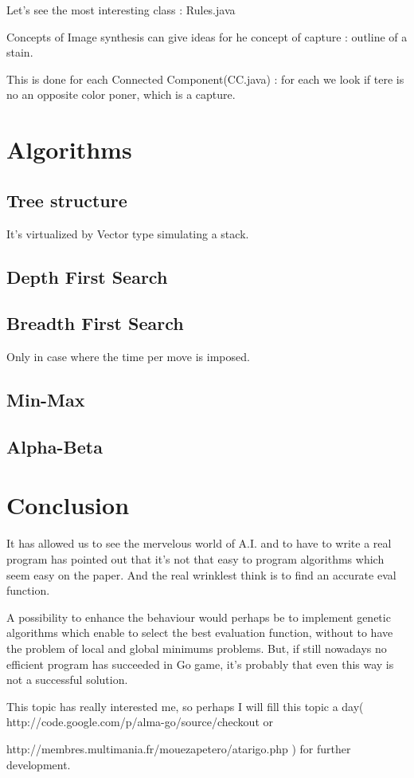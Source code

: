 \documentclass{book}
\begin{document}
Let's see the most interesting class : Rules.java

Concepts of Image synthesis can give ideas for he concept of capture : outline of a stain.

This is done for each Connected Component(CC.java) : for each we look if tere is no an opposite color poner, which is a capture. 
\chapter{Algorithms}

\section{Tree structure}
It's virtualized by Vector type simulating a stack.
\section{Depth First Search}
\section{Breadth First Search}
Only in case where the time per move is imposed.
\section{Min-Max}
\section{Alpha-Beta}



\chapter{Conclusion}
It has allowed us to see the mervelous world of A.I. and to have to write a real program has pointed out that it's not that easy to program algorithms which seem easy on the paper.
And the real wrinklest think is to find an accurate eval function.

A possibility to enhance the behaviour would perhaps be to
 implement genetic algorithms which enable to
select the best evaluation function, without 
to have the problem of local and global 
minimums problems. But, if still nowadays no efficient program has succeeded in Go game, it's probably that even this way is not a successful solution.

This topic has really interested me, so perhaps I will fill this topic a
day( http://code.google.com/p/alma-go/source/checkout or
 
http://membres.multimania.fr/mouezapetero/atarigo.php  )  for further development.
\end{document}
